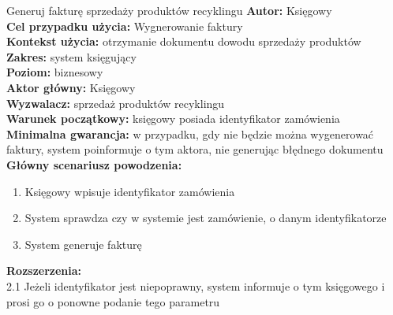 \begin{usecase}{Generuj fakturę sprzedaży produktów recyklingu}
	\textbf{Autor:} Księgowy\\
	\textbf{Cel przypadku użycia:} Wygnerowanie faktury \\
	\textbf{Kontekst użycia:} otrzymanie dokumentu dowodu sprzedaży produktów  \\
	\textbf{Zakres:} system księgujący \\
	\textbf{Poziom:} biznesowy \\
	\textbf{Aktor główny:} Księgowy \\
	\textbf{Wyzwalacz:} sprzedaż produktów recyklingu \\
	\textbf{Warunek początkowy:} księgowy posiada identyfikator zamówienia \\
	\textbf{Minimalna gwarancja:} w przypadku, gdy nie będzie można wygenerować faktury, system poinformuje o tym aktora, nie generując błędnego dokumentu \\
	\textbf{Główny scenariusz powodzenia:} 
		\begin{enumerate}
			\item Księgowy wpisuje identyfikator zamówienia
			\item System sprawdza czy w systemie jest zamówienie, o danym identyfikatorze
			\item System generuje fakturę 
		\end{enumerate}
	\textbf{Rozszerzenia:} \\
	2.1 Jeżeli identyfikator jest niepoprawny, system informuje o tym księgowego i prosi go o ponowne podanie tego parametru
\end{usecase}

